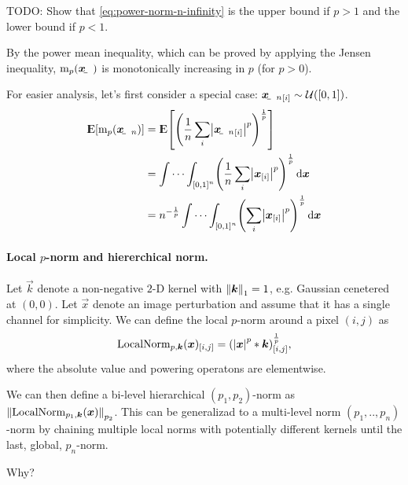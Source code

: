 \documentclass[oneside]{book}
\begin{document}
TODO: Show that \eqref{eq:power-norm-n-infinity} is the upper bound if $p>1$ and the lower bound if $p<1$.

By the power mean inequality, which can be proved by applying the Jensen inequality, $\mathrm{m}_p(\rvec x)$ is monotonically increasing in $p$ (for $p>0$).


For easier analysis, let's first consider a special case: ${\rvec x_n}_\ind{i}\sim\mathcal{U}\del{\intcc{0,1}}$.
\begin{align*}
\E \sbr{\mathrm{m}_p(\rvec x_n)}
&= \E\sbr{\del{\frac{1}{n}\sum_i \envert{{\rvec x_n}_\ind{i}}^p}^\frac{1}{p}}  \\
&= \idotsint_{\intcc{0,1}^n} \del{\frac{1}{n}\sum_i \envert{\vec x_\ind{i}}^p}^\frac{1}{p} \dif\vec x  \\
&= n^{-\frac{1}{p}}\idotsint_{\intcc{0,1}^n} \del{\sum_i \envert{\vec x_\ind{i}}^p}^\frac{1}{p} \dif\vec x  
\end{align*}


\paragraph{Local $p$-norm and hiererchical norm.}
Let $\vec k$ denote a non-negative $2$-D kernel with $\enVert{\vec k}_1=1$, e.g. Gaussian cenetered at $(0,0)$. Let $\vec x$ denote an image perturbation and assume that it has a single channel for simplicity.
We can define the local $p$-norm around a pixel $(i, j)$ as
\begin{align}
\mathrm{LocalNorm}_{p,\vec k}(\vec x)_\ind{i,j} = \del{\envert{\vec x}^p * \vec k}_\ind{i,j}^\frac{1}{p},
\end{align}
where the absolute value and powering operatons are elementwise.

We can then define a bi-level hierarchical $(p_1,p_2)$-norm as $\enVert{\mathrm{LocalNorm}_{p_1,\vec k}(\vec x)}_{p_2}$. This can be generalizad to a multi-level norm $(p_1,..,p_n)$-norm by chaining multiple local norms with potentially different kernels until the last, global, $p_n$-norm.

Why?









 
%
\end{document}
